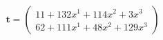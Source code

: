 \documentclass[preview]{standalone}
\begin{document}
\begin{align*}
\mathbf{t} = \begin{pmatrix}11 + 132x^{1} + 114x^{2} + 3x^{3} \\ 62 + 111x^{1} + 48x^{2} + 129x^{3}\end{pmatrix}
\end{align*}
\end{document}

